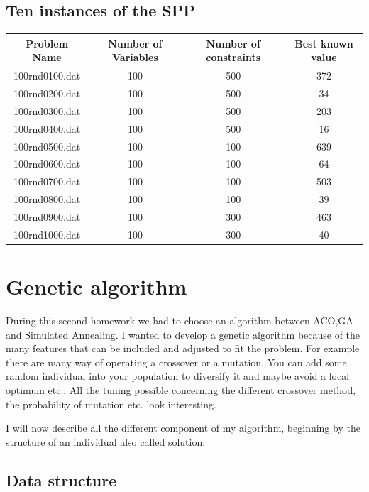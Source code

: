 \documentclass[12pt]{article}
\begin{document}
	\subsection{Ten instances of the SPP}
	\begin{center}
		\begin{tabular}{|c|c|c|c|}
			\hline
			Problem Name & Number of Variables & Number of constraints & Best known value \\
			\hline
			100rnd0100.dat & 100 & 500 & 372\\
			\hline
			100rnd0200.dat & 100 & 500 & 34\\
			\hline
			100rnd0300.dat & 100 & 500 & 203\\
			\hline
			100rnd0400.dat & 100 & 500 & 16\\
			\hline
			100rnd0500.dat & 100 & 100 & 639\\
			\hline
			100rnd0600.dat & 100 & 100 & 64\\
			\hline
			100rnd0700.dat & 100 & 100 & 503\\
			\hline
			100rnd0800.dat & 100 & 100 & 39\\
			\hline
			100rnd0900.dat & 100 & 300 & 463\\
			\hline
			100rnd1000.dat & 100 & 300 & 40\\
			\hline
		\end{tabular}
	\end{center}
	
	
	

	\section{Genetic algorithm}
	
	During this second homework we had to choose an algorithm between ACO,GA and Simulated Annealing. I wanted to develop a genetic algorithm because of the many features that can be included and adjusted to fit the problem. For example there are many way of operating a crossover or a mutation. You can add some random individual into your population to diversify it and maybe avoid a local optimum etc.. All the tuning possible concerning the different crossover method, the probability of mutation etc. look interesting.
	
	I will now describe all the different component of my algorithm, beginning by the structure of an individual also called solution.
	
	\subsection{Data structure}
\end{document}
